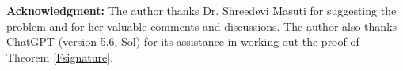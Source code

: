 \documentclass[11pt, reqno]{amsart}
\theoremstyle{plain}
\newtheorem{question}[theorem]{Question}
\newcommand{\m}{\mathfrak{m}}
\theoremstyle{plain}
\begin{document}









\noindent
\textbf{Acknowledgment:} The author thanks Dr. Shreedevi Masuti for suggesting the problem and for her valuable comments and discussions. The author also thanks ChatGPT (version 5.6, Sol) for its assistance in working out the proof of Theorem \ref{Fsignature}.
\end{document}

